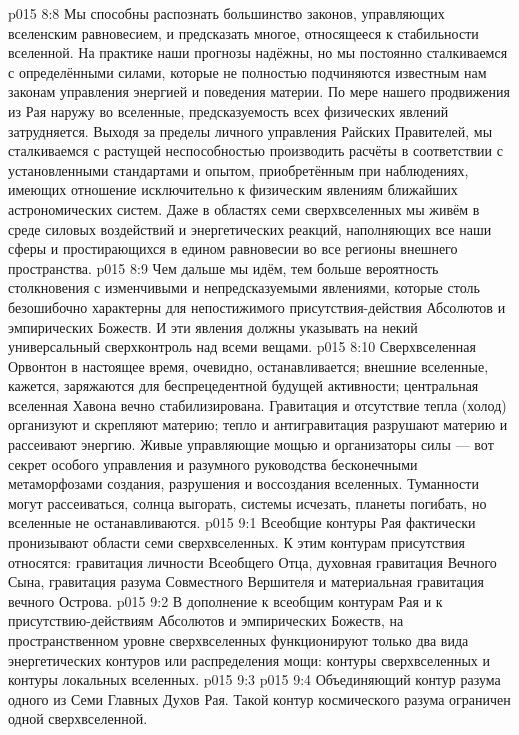 \vs p015 8:8 Мы способны распознать большинство законов, управляющих вселенским равновесием, и предсказать многое, относящееся к стабильности вселенной. На практике наши прогнозы надёжны, но мы постоянно сталкиваемся с определёнными силами, которые не полностью подчиняются известным нам законам управления энергией и поведения материи. По мере нашего продвижения из Рая наружу во вселенные, предсказуемость всех физических явлений затрудняется. Выходя за пределы личного управления Райских Правителей, мы сталкиваемся с растущей неспособностью производить расчёты в соответствии с установленными стандартами и опытом, приобретённым при наблюдениях, имеющих отношение исключительно к физическим явлениям ближайших астрономических систем. Даже в областях семи сверхвселенных мы живём в среде силовых воздействий и энергетических реакций, наполняющих все наши сферы и простирающихся в едином равновесии во все регионы внешнего пространства.
\vs p015 8:9 Чем дальше мы идём, тем больше вероятность столкновения с изменчивыми и непредсказуемыми явлениями, которые столь безошибочно характерны для непостижимого присутствия\hyp{}действия Абсолютов и эмпирических Божеств. И эти явления должны указывать на некий универсальный сверхконтроль над всеми вещами.
\vs p015 8:10 Сверхвселенная Орвонтон в настоящее время, очевидно, останавливается; внешние вселенные, кажется, заряжаются для беспрецедентной будущей активности; центральная вселенная Хавона вечно стабилизирована. Гравитация и отсутствие тепла (холод) организуют и скрепляют материю; тепло и антигравитация разрушают материю и рассеивают энергию. Живые управляющие мощью и организаторы силы --- вот секрет особого управления и разумного руководства бесконечными метаморфозами создания, разрушения и воссоздания вселенных. Туманности могут рассеиваться, солнца выгорать, системы исчезать, планеты погибать, но вселенные не останавливаются.
\vs p015 9:1 Всеобщие контуры Рая фактически пронизывают области семи сверхвселенных. К этим контурам присутствия относятся: гравитация личности Всеобщего Отца, духовная гравитация Вечного Сына, гравитация разума Совместного Вершителя и материальная гравитация вечного Острова.
\vs p015 9:2 В дополнение к всеобщим контурам Рая и к присутствию\hyp{}действиям Абсолютов и эмпирических Божеств, на пространственном уровне сверхвселенных функционируют только два вида энергетических контуров или распределения мощи: контуры сверхвселенных и контуры локальных вселенных.
\vs p015 9:3 \pc {}
\vs p015 9:4 Объединяющий контур разума одного из Семи Главных Духов Рая. Такой контур космического разума ограничен одной сверхвселенной.
